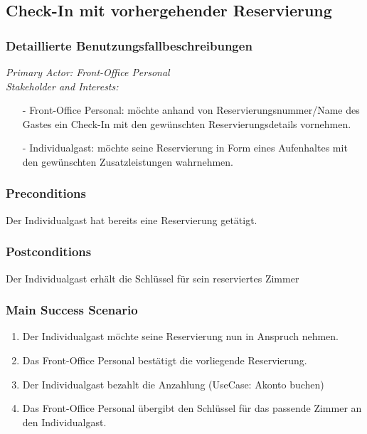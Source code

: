 \documentclass[./detailed_overview_usecases.tex]{subfiles}
\begin{document}
    \subsection{Check-In mit vorhergehender Reservierung}
    \subsubsection{Detaillierte Benutzungsfallbeschreibungen}
    \textit{Primary Actor: Front-Office Personal}
    \\
    \textit{Stakeholder and Interests:}
    \begin{itemize}
        \item[-] Front-Office Personal: möchte anhand von Reservierungsnummer/Name des Gastes ein Check-In mit den gewünschten Reservierungsdetails vornehmen.
        \item[-] Individualgast: möchte seine Reservierung in Form eines Aufenhaltes mit den gewünschten Zusatzleistungen wahrnehmen.
    \end{itemize}

    \subsubsection*{Preconditions}
    Der Individualgast hat bereits eine Reservierung getätigt.
    \subsubsection*{Postconditions}
    Der Individualgast erhält die Schlüssel für sein reserviertes Zimmer

    \subsubsection*{Main Success Scenario}
    \begin{enumerate}
        \item Der Individualgast möchte seine Reservierung nun in Anspruch nehmen.
        \item Das Front-Office Personal bestätigt die vorliegende Reservierung.
        \item Der Individualgast bezahlt die Anzahlung (UseCase: Akonto buchen)
        \item Das Front-Office Personal übergibt den Schlüssel für das passende Zimmer an den Individualgast.
    \end{enumerate}
\end{document}
